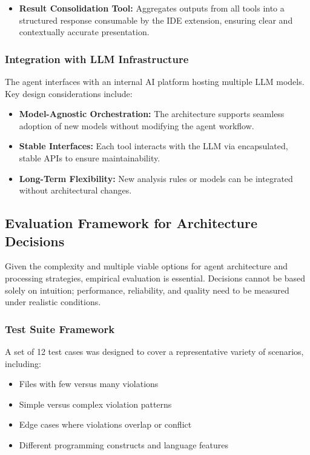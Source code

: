 \begin{spacing}{1.2}
\begin{itemize}
    \item \textbf{Result Consolidation Tool:} Aggregates outputs from all tools into a structured response consumable by the IDE extension, ensuring clear and contextually accurate presentation.
\end{itemize}

\subsubsection{Integration with LLM Infrastructure}
The agent interfaces with an internal AI platform hosting multiple LLM models. Key design considerations include:

\begin{itemize}
    \item \textbf{Model-Agnostic Orchestration:} The architecture supports seamless adoption of new models without modifying the agent workflow.
    \item \textbf{Stable Interfaces:} Each tool interacts with the LLM via encapsulated, stable APIs to ensure maintainability.
    \item \textbf{Long-Term Flexibility:} New analysis rules or models can be integrated without architectural changes.
\end{itemize}

\subsection{Evaluation Framework for Architecture Decisions}
Given the complexity and multiple viable options for agent architecture and processing strategies, empirical evaluation is essential. Decisions cannot be based solely on intuition; performance, reliability, and quality need to be measured under realistic conditions.

\subsubsection{Test Suite Framework}
A set of 12 test cases was designed to cover a representative variety of scenarios, including:

\begin{itemize}
    \item Files with few versus many violations
    \item Simple versus complex violation patterns
    \item Edge cases where violations overlap or conflict
    \item Different programming constructs and language features
\end{itemize}


\end{spacing}
